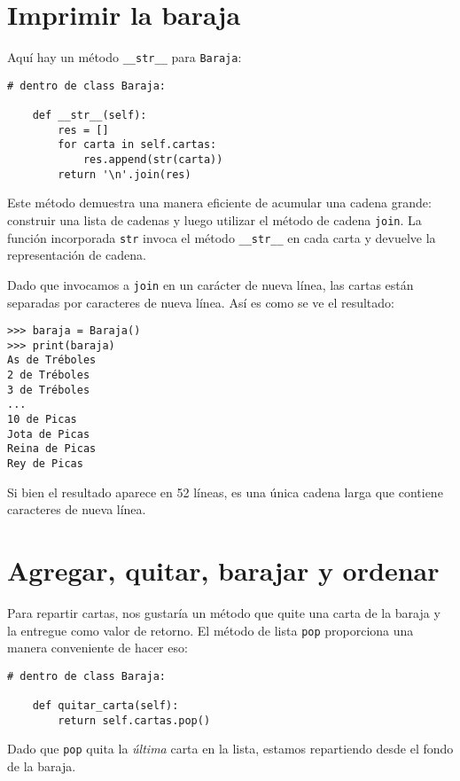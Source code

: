 \documentclass[10pt]{book}
\begin{document}
\section{Imprimir la baraja}
\label{printdeck}

Aquí hay un método \verb"__str__" para {\tt Baraja}:

\begin{verbatim}
# dentro de class Baraja:

    def __str__(self):
        res = []
        for carta in self.cartas:
            res.append(str(carta))
        return '\n'.join(res)
\end{verbatim}
%
Este método demuestra una manera eficiente de acumular una cadena
grande: construir una lista de cadenas y luego utilizar el método de cadena
{\tt join}.  La función incorporada {\tt str} invoca el método
\verb"__str__" en cada carta y devuelve la representación
de cadena.   
  

Dado que invocamos a {\tt join} en un carácter de nueva línea, las cartas
están separadas por caracteres de nueva línea.  Así es como se ve el resultado:

\begin{verbatim}
>>> baraja = Baraja()
>>> print(baraja)
As de Tréboles
2 de Tréboles
3 de Tréboles
...
10 de Picas
Jota de Picas
Reina de Picas
Rey de Picas
\end{verbatim}
%
Si bien el resultado aparece en 52 líneas, es una única
cadena larga que contiene caracteres de nueva línea.


\section{Agregar, quitar, barajar y ordenar}

Para repartir cartas, nos gustaría un método que
quite una carta de la baraja y la entregue como valor de retorno.
El método de lista {\tt pop} proporciona una manera conveniente de hacer eso:

\begin{verbatim}
# dentro de class Baraja:

    def quitar_carta(self):
        return self.cartas.pop()
\end{verbatim}
%
Dado que {\tt pop} quita la {\em última} carta en la lista, estamos
repartiendo desde el fondo de la baraja.
\end{document}
